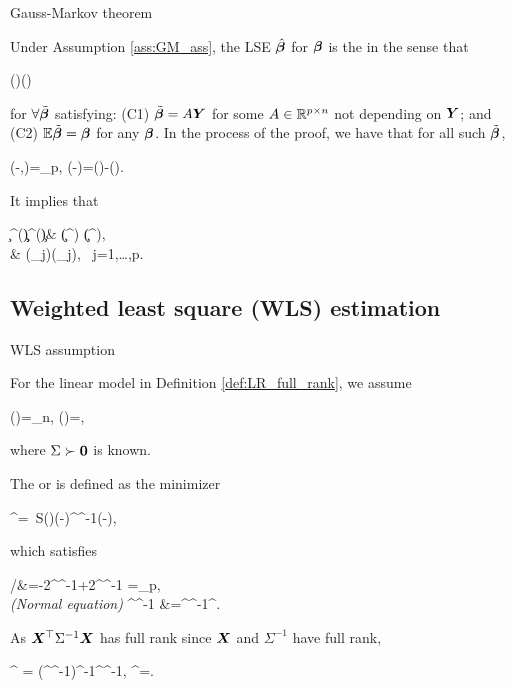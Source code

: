 \documentclass[10pt,a4paper]{book}
\begin{document}
\begin{thmbox}{Gauss-Markov theorem}
	\begin{theorem}\label{thm:GM_OLS}
		Under Assumption \ref{ass:GM_ass}, the LSE $\hat{{\boldsymbol\beta}}$ for ${\boldsymbol\beta}$ is the  in the sense that 
		\begin{sequation*}
			\Cov(\tilde{\bab})\succeq\Cov(\hat{\bab})
		\end{sequation*}
		for $\forall \tilde{{\boldsymbol\beta}}$ satisfying: (C1) $\tilde{{\boldsymbol\beta}}=A{\boldsymbol Y}$ for some $A\in\mathbb R^{p\times n}$ not depending on ${\boldsymbol Y}$; and (C2) $\mathbb E\tilde{{\boldsymbol\beta}}={\boldsymbol\beta}$ for any ${\boldsymbol\beta}$.     
		In the process of the proof, we have that for all such $\tilde{{\boldsymbol\beta}}$, 
		\begin{salign*}
			\Cov(\tilde{\bab}-\hat{\bab},\hat{\bab})=\0_p, \qquad \Cov(\tilde{\bab}-\hat{\bab})=\Cov(\tilde{\bab})-\Cov(\hat{\bab}).
		\end{salign*}
	\end{theorem}
\end{thmbox}
It implies that 
\begin{salign*}
	\c^\TT \Cov(\tilde{\bab})\c \geq \c^\TT \Cov(\hat{\bab})\c \quad  \Leftrightarrow \quad & \Var(\c^\TT \tilde{\bab}) \geq \Var(\c^\TT \hat{\bab}),\\
	& \Var(\tilde{\beta}_j)\geq \Var(\hat{\beta}_j), \ j=1,\ldots,p.
\end{salign*}

\subsection{Weighted least square (WLS) estimation}\label{sec:LR_full_rank_WLS}
\begin{assbox}{WLS assumption}
	\begin{assumption}\label{ass:GM_ass_WLS}
		For the linear model in Definition \ref{def:LR_full_rank}, we assume 
		\begin{sequation}\label{eq:GM_ass_WLS}
			\bbE(\bave)=\0_n, \qquad \Cov(\bave)=\Sigma, 
		\end{sequation}
		where $\Sigma\succ{\boldsymbol 0}$ is known. 
	\end{assumption}
\end{assbox}
The  or  is defined as the minimizer 
\begin{salign*}
	\hat{\bab}^{\WLS}=\ S(\bab)\equiv (\Y-\X\bab)^\TT\Sigma^{-1}(\Y-\X\bab),
\end{salign*}
which satisfies 
\begin{salign*}
	 /{\partial\bab}&=-2\X^\TT\Sigma^{-1}\Y+2\X^\TT \Sigma^{-1} \X\bab=\0_p, \\ 
	\textit{({Normal equation})} \qquad \X^\TT\Sigma^{-1} \Y&=\X^\TT\Sigma^{-1}\X\hat{\bab}^{\WLS}.
\end{salign*}
As ${\boldsymbol X}^\top\Sigma^{-1}{\boldsymbol X}$ has full rank since ${\boldsymbol X}$ and $\Sigma^{-1}$ have full rank,
\begin{salign}\label{eq:LR_WLSE}
	\hat{\bab}^{\WLS} = (\X^\TT\Sigma^{-1}\X)^{-1}\X^\TT\Sigma^{-1}\Y, \qquad \bbE\hat{\bab}^{\WLS}=\bab.
\end{salign} 
\end{document}
